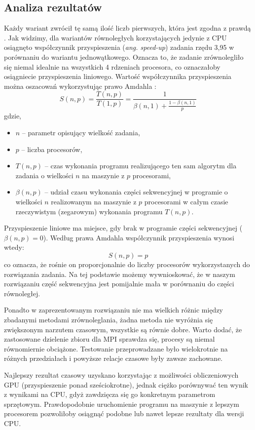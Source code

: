 \documentclass[12pt, twoside, hidelinks, a4paper]{article}
\begin{document}
\subsection{Analiza rezultatów}
Każdy wariant zwrócił tę samą ilość liczb pierwszych, która jest zgodna z prawdą \cite{c3}. Jak widzimy, dla wariantów równoległych korzystających jedynie z CPU osiągnęto współczynnik przyspieszenia (\textit{ang. speed-up}) zadania rzędu 3,95 w porównaniu do wariantu jednowątkowego. Oznacza to, że zadanie zrównolegliło się niemal idealnie na wszystkich 4 rdzeniach procesora, co oznaczałoby osiągniecie przyspieszenia liniowego. Wartość współczynnika przyspieszenia można oszacowań wykorzystując prawo Amdahla \cite{c4}:
\begin{equation}
S(n,p)=\frac{T(n,p)}{T(1,p)}=\frac{1}{\beta(n,1)+\frac{1-\beta(n,1)}{p}}
\end{equation}
gdzie,
\begin{itemize}
\item $n$ – parametr opisujący wielkość zadania,
\item $p$ – liczba procesorów,
\item $T(n, p)$ – czas wykonania programu realizującego ten sam algorytm dla zadania o wielkości $n$ na maszynie z $p$ procesorami,
\item $\beta(n, p)$ – udział czasu wykonania części sekwencyjnej w programie o wielkości $n$ realizowanym na maszynie z $p$ procesorami w całym czasie rzeczywistym (zegarowym) wykonania programu $T(n, p)$.
\end{itemize}
Przyspieszenie liniowe ma miejsce, gdy brak w programie części sekwencyjnej (\textit{$\beta(n, p) = 0$}). Według prawa Amdahla współczynnik przyspieszenia wynosi wtedy:
\begin{equation}
S(n, p) = p
\end{equation}
co oznacza, że rośnie on proporcjonalnie do liczby procesorów wykorzystanych do rozwiązania zadania. Na tej podstawie możemy wywnioskować, że w naszym rozwiązaniu część sekwencyjna jest pomijalnie mała w porównaniu do części równoległej.

Ponadto w zaprezentowanym rozwiązaniu nie ma wielkich różnic między zbadanymi metodami zrównoleglania, żadna metoda nie wyróżnia się zwiększonym narzutem czasowym, wszystkie są równie dobre. Warto dodać, że zastosowane dzielenie zbioru dla MPI sprawdza się, procesy są niemal równomiernie obciążone. Testowanie przeprowadzane było wielokrotnie na różnych przedziałach i powyższe relacje czasowe były zawsze zachowane.

Najlepszy rezultat czasowy uzyskano korzystając z możliwości obliczeniowych GPU (przyspieszenie ponad sześciokrotne), jednak ciężko porównywać ten wynik z wynikami na CPU, gdyż zawdzięcza się go konkretnym parametrom sprzętowym. Prawdopodobnie uruchomienie programu na maszynie z lepszym procesorem pozwoliłoby osiągnąć podobne lub nawet lepsze rezultaty dla wersji CPU.

\printbibliography
\end{document}
